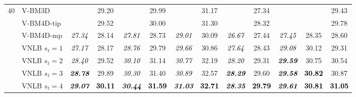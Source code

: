 \documentclass[10pt, a4paper]{article}
\newcommand{\best}[1]{#1}
\newcommand{\bsic}[1]{\textcolor{black}{\textit{#1}}}
\newcommand{\Bsic}[1]{\textcolor{black}{\textbf{\textit{#1}}}}
\newcommand{\Best}[1]{\textbf{\textcolor{black}{#1}}}
\begin{document}
\begin{table}[htp!]
\begin{center}
{\begin{tabular}{ c | l |c c | c c | c c | c c | c c | c}
%
			\multirow{1}{*}{$40$}
			                      & V-BM3D               & \bsic{     } &       29.20  & \bsic{     } & \best{29.99} & \bsic{     } &       31.17  & \bsic{     } &       27.34  & \bsic{     } &              &       29.43  \\
			                      & V-BM4D-tip           & \bsic{     } & \best{29.52} & \bsic{     } & \best{30.00} & \bsic{     } & \best{31.30} & \bsic{     } &       28.32  & \bsic{     } &              &       29.78  \\
			                      & V-BM4D-mp            & \bsic{27.34} &       28.14  & \bsic{27.81} &       28.73  & \bsic{29.01} &       30.09  & \bsic{26.67} &       27.44  & \bsic{27.45} &       28.35  &       28.60  \\
			                      & VNLB   $s_t = 1$     & \bsic{27.17} &       28.17  & \bsic{28.76} &       29.79  & \bsic{29.66} &       30.86  & \bsic{27.64} &       28.43  & \bsic{29.08} &       30.12  &       29.31  \\
			                      & VNLB   $s_t = 2$     & \bsic{28.40} &       29.52  & \bsic{30.10} &       31.14  & \bsic{30.77} &       32.19  & \bsic{28.20} &       29.31  & \Bsic{29.59} &       30.75  &       30.54  \\
			                      & VNLB   $s_t = 3$     & \Bsic{28.78} &       29.89  & \bsic{30.30} &       31.40  & \bsic{30.89} &       32.57  & \Bsic{28.29} &       29.60  & \Bsic{29.58} & \Best{30.82} &       30.87  \\
			                      & VNLB   $s_t = 4$     & \Bsic{29.07} & \Best{30.11} & \Bsic{30.44} & \Best{31.59} & \Bsic{31.03} & \Best{32.71} & \Bsic{28.35} & \Best{29.79} & \Bsic{29.61} & \Best{30.81} & \Best{31.05} \\\hline

\end{tabular}}
\end{center}
\end{table}
\end{document}

